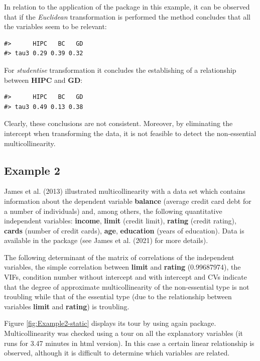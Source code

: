 In relation to the application of the  package in this example, it can be observed that if the \emph{Euclidean} transformation is performed the method concludes that all the variables seem to be relevant:

\begin{verbatim}
#>      HIPC   BC   GD
#> tau3 0.29 0.39 0.32
\end{verbatim}

For \emph{studentise} transformation it concludes the establishing of a relationship between \textbf{HIPC} and \textbf{GD}:

\begin{verbatim}
#>      HIPC   BC   GD
#> tau3 0.49 0.13 0.38
\end{verbatim}

Clearly, these conclusions are not consistent. Moreover, by eliminating the intercept when transforming the data, it is not feasible to detect the non-essential multicollinearity.

\hypertarget{example-2}{%
\subsection{Example 2}\label{example-2}}

James et al. (2013) illustrated multicollinearity with a data set which contains information about the dependent variable \textbf{balance} (average credit card debt for a number of individuals) and, among others, the following quantitative independent variables: \textbf{income}, \textbf{limit} (credit limit), \textbf{rating} (credit rating), \textbf{cards} (number of credit cards), \textbf{age}, \textbf{education} (years of education). Data is available in the  package (see James et al. (2021) for more details).

The following determinant of the matrix of correlations of the independent variables, the simple correlation between \textbf{limit} and \textbf{rating} (0.99687974), the VIFs, condition number without intercept and with intercept and CVs indicate that the degree of approximate multicollinearity of the non-essential type is not troubling while that of the essential type (due to the relationship between variables \textbf{limit} and \textbf{rating}) is troubling.

Figure \ref{fig:Example2-static} displays its tour by using again  package. Multicollinearity was checked using a tour on all the explanatory variables (it runs for 3.47 minutes in html version). In this case a certain linear relationship is observed, although it is difficult to determine which variables are related.

